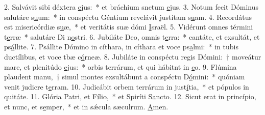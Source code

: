 2. Salvávit sibi déxtera \uline{e}jus:~* et bráchium snctum \uline{e}jus.
3. Notum fecit Dóminus salutáre s\uline{u}um:~* in conspéctu Géntium revelávit justítam s\uline{u}am.
4. Recordátus est misericórdiæ s\uline{u}æ,~* et veritátis suæ dómi \uline{I}sraël.
5. Vidérunt omnes términi t\uline{e}rræ~* salutáre Di n\uline{o}stri.
6. Jubiláte Deo, omnis t\uline{e}rra:~* cantáte, et exsultát, et ps\uline{á}llite.
7. Psállite Dómino in cíthara, in cíthara et voce ps\uline{a}lmi:~* in tubis ductílibus, et voce tbæ c\uline{ó}rneæ.
8. Jubiláte in conspéctu regis Dómini:~† moveátur mare, et plenitúdo \uline{e}jus:~* orbis terrárum, et qui hábitnt in \uline{e}o.
9. Flúmina plaudent manu,~† simul montes exsultábunt a conspéctu D\uline{ó}mini:~* quóniam venit judicre t\uline{e}rram.
10. Judicábit orbem terrárum in just\uline{í}tia,~* et pópulos in quit\uline{á}te.
11. Glória Patri, et F\uline{í}lio,~* et Spiríti S\uline{a}ncto.
12. Sicut erat in princípio, et nunc, et s\uline{e}mper,~* et in sǽcula sæculrum. \uline{A}men.
